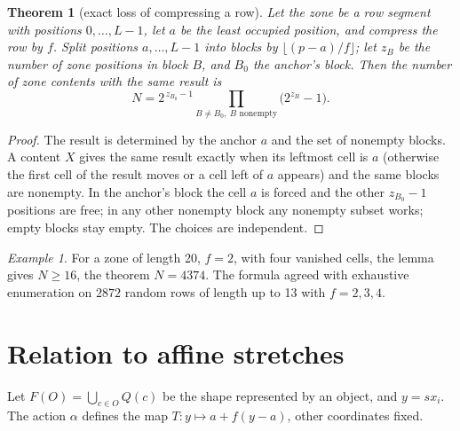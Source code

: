 \documentclass[11pt,a4paper]{article}
\theoremstyle{plain}
\newtheorem{theorem}{Theorem}
\theoremstyle{definition}
\theoremstyle{remark}
\newtheorem*{example}{Example}
\begin{document}
\begin{theorem}[exact loss of compressing a row]\label{thm:exact}
Let the zone be a row segment with positions $0,\dots,L-1$, let $a$ be the least occupied position, and compress the row by $f$. Split positions $a,\dots,L-1$ into blocks by $\lfloor (p-a)/f\rfloor$; let $z_B$ be the number of zone positions in block $B$, and $B_0$ the anchor's block. Then the number of zone contents with the same result is
\[
N=2^{\,z_{B_0}-1}\prod_{B\ne B_0,\ B\text{ nonempty}}\bigl(2^{z_B}-1\bigr).
\]
\end{theorem}
\begin{proof}
The result is determined by the anchor $a$ and the set of nonempty blocks. A content $X$ gives the same result exactly when its leftmost cell is $a$ (otherwise the first cell of the result moves or a cell left of $a$ appears) and the same blocks are nonempty. In the anchor's block the cell $a$ is forced and the other $z_{B_0}-1$ positions are free; in any other nonempty block any nonempty subset works; empty blocks stay empty. The choices are independent.
\end{proof}

\begin{example}
For a zone of length 20, $f=2$, with four vanished cells, the lemma gives $N\ge16$, the theorem $N=4374$. The formula agreed with exhaustive enumeration on $2872$ random rows of length up to 13 with $f=2,3,4$.
\end{example}

\section{Relation to affine stretches}\label{sec:affine}

Let $F(O)=\bigcup_{c\in O}Q(c)$ be the shape represented by an object, and $y=sx_i$. The action $\alpha$ defines the map $T\colon y\mapsto a+f(y-a)$, other coordinates fixed.
\end{document}
